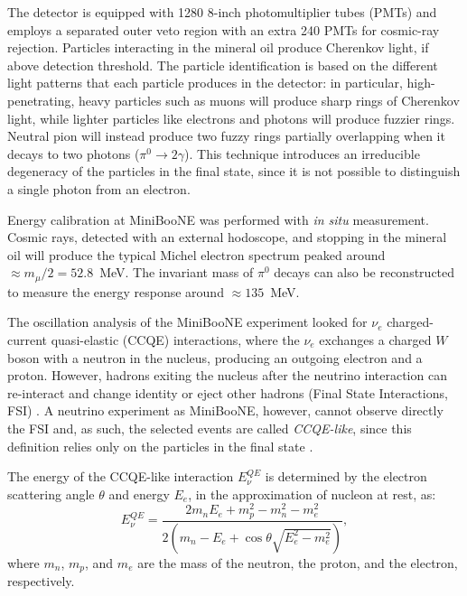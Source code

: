 The detector is equipped with 1280 8-inch photomultiplier tubes (PMTs) and employs a separated outer veto region with an extra 240 PMTs for cosmic-ray rejection. Particles interacting in the mineral oil produce Cherenkov light, if above detection threshold. The particle identification is based on the different light patterns that each particle produces in the detector: in particular, high-penetrating, heavy particles such as muons will produce sharp rings of Cherenkov light, while lighter particles like electrons and photons will produce fuzzier rings. Neutral pion will instead produce two fuzzy rings partially overlapping when it decays to two photons ($\pi^{0}\rightarrow 2\gamma$). 
This technique introduces an irreducible degeneracy of the particles in the final state, since it is not possible to distinguish a single photon from an electron. 

Energy calibration at MiniBooNE was performed with \emph{in situ} measurement. Cosmic rays, detected with an external hodoscope, and stopping in the mineral oil will produce the typical Michel electron spectrum peaked around $\approx m_{\mu}/2 = 52.8$~MeV. The invariant mass of $\pi^0$ decays can also be reconstructed to measure the energy response around $\approx135$~MeV. 

The oscillation analysis of the MiniBooNE experiment looked for $\nu_e$ charged-current quasi-elastic (CCQE) interactions, where the $\nu_{e}$ exchanges a charged $W$ boson with a neutron in the nucleus, producing an outgoing electron and a proton.
However, hadrons exiting the nucleus after the neutrino interaction can re-interact and change identity or eject other hadrons (Final State Interactions, FSI) \cite{Martini:2013sha}. A neutrino experiment as MiniBooNE, however, cannot observe directly the FSI and, as such, the selected events are called \emph{CCQE-like}, since this definition relies only on the particles in the final state \cite{Katori:2013nca}. 

The energy of the CCQE-like interaction $E_{\nu}^{QE}$ is determined by the electron scattering angle $\theta$ and energy $E_e$, in the approximation of nucleon at rest, as:
\begin{equation}
    E_{\nu}^{QE} = \frac{2m_n E_e + m_p^2- m_n^2 - m_e^2}{2(m_n - E_e + \cos\theta\sqrt{E_e^2-m_e^2})},
\end{equation}
where $m_n$, $m_p$, and $m_e$ are the mass of the neutron, the proton, and the electron, respectively.

